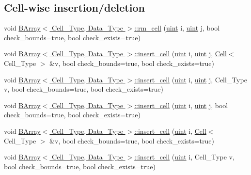 \subsection*{Cell-\/wise insertion/deletion}
\begin{DoxyCompactItemize}
\item 
void \hyperlink{group__barray-insert_gaaead894ff275479db4f733793ce037db}{B\+Array$<$ Cell\+\_\+\+Type, Data\+\_\+\+Type $>$\+::rm\+\_\+cell} (\hyperlink{typedefs_8hpp_a91ad9478d81a7aaf2593e8d9c3d06a14}{uint} i, \hyperlink{typedefs_8hpp_a91ad9478d81a7aaf2593e8d9c3d06a14}{uint} j, bool check\+\_\+bounds=true, bool check\+\_\+exists=true)
\item 
void \hyperlink{group__barray-insert_ga098b5214df6790a5b4aaf3e0f7c1473a}{B\+Array$<$ Cell\+\_\+\+Type, Data\+\_\+\+Type $>$\+::insert\+\_\+cell} (\hyperlink{typedefs_8hpp_a91ad9478d81a7aaf2593e8d9c3d06a14}{uint} i, \hyperlink{typedefs_8hpp_a91ad9478d81a7aaf2593e8d9c3d06a14}{uint} j, \hyperlink{class_cell}{Cell}$<$ Cell\+\_\+\+Type $>$ \&v, bool check\+\_\+bounds=true, bool check\+\_\+exists=true)
\item 
void \hyperlink{group__barray-insert_gaa7268761d977833b688123d161d17d1b}{B\+Array$<$ Cell\+\_\+\+Type, Data\+\_\+\+Type $>$\+::insert\+\_\+cell} (\hyperlink{typedefs_8hpp_a91ad9478d81a7aaf2593e8d9c3d06a14}{uint} i, \hyperlink{typedefs_8hpp_a91ad9478d81a7aaf2593e8d9c3d06a14}{uint} j, Cell\+\_\+\+Type v, bool check\+\_\+bounds=true, bool check\+\_\+exists=true)
\item 
void \hyperlink{group__barray-insert_ga4deb6afa6040603fc4fb5a90eef90761}{B\+Array$<$ Cell\+\_\+\+Type, Data\+\_\+\+Type $>$\+::insert\+\_\+cell} (\hyperlink{typedefs_8hpp_a91ad9478d81a7aaf2593e8d9c3d06a14}{uint} i, \hyperlink{typedefs_8hpp_a91ad9478d81a7aaf2593e8d9c3d06a14}{uint} j, bool check\+\_\+bounds=true, bool check\+\_\+exists=true)
\item 
void \hyperlink{group__barray-insert_gac631a7a4b7308b00073a5e521d548933}{B\+Array$<$ Cell\+\_\+\+Type, Data\+\_\+\+Type $>$\+::insert\+\_\+cell} (\hyperlink{typedefs_8hpp_a91ad9478d81a7aaf2593e8d9c3d06a14}{uint} i, \hyperlink{class_cell}{Cell}$<$ Cell\+\_\+\+Type $>$ \&v, bool check\+\_\+bounds=true, bool check\+\_\+exists=true)
\item 
void \hyperlink{group__barray-insert_gaeeee5972aa4301465b84dfc431fa6cf9}{B\+Array$<$ Cell\+\_\+\+Type, Data\+\_\+\+Type $>$\+::insert\+\_\+cell} (\hyperlink{typedefs_8hpp_a91ad9478d81a7aaf2593e8d9c3d06a14}{uint} i, Cell\+\_\+\+Type v, bool check\+\_\+bounds=true, bool check\+\_\+exists=true)

\end{DoxyCompactItemize}
